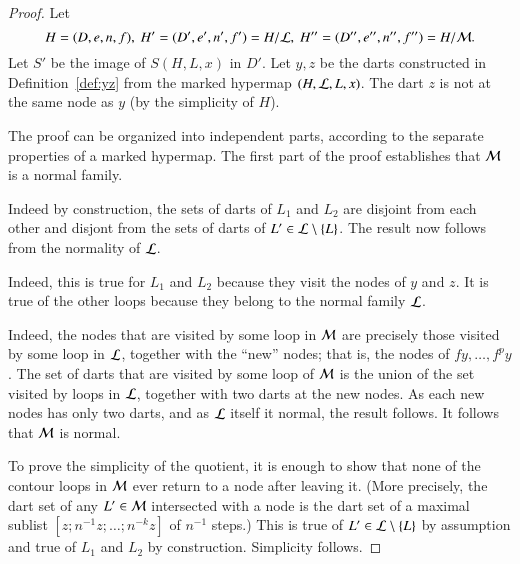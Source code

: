 \begin{proof} Let 
\begin{displaymath}
H=(D,e,n,f),\   H' =(D',e',n',f') = H/{\cal
    L},\  H'' = (D'',e'',n'',f'') = H/{\cal M}.   
\end{displaymath}
Let $S'$ be the image of $S(H,L,x)$ in $D'$.  Let $y,z$ be the darts
constructed in Definition~\ref{def:yz} from the marked hypermap $(H,{\cal
  L},L,x)$.  The dart $z$ is not at the same node as $y$ (by
the simplicity of $H$).

  The proof can be organized into independent parts, according to the separate
  properties of a marked hypermap.  The first part of the proof
  establishes that ${\cal M}$ is a normal family.


 
Indeed by construction, the sets of darts of $L_1$ and $L_2$
are disjoint from each other and disjont from the sets of darts of $L'\in
{\cal L}\setminus \{L\}$.  The result now follows from the normality of  ${\cal L}$.

   Indeed, this
is true for $L_1$ and $L_2$ because they visit the nodes of $y$ and
$z$.  It is true of the other loops because they belong to the
normal family ${\cal L}$. 

  
Indeed, the nodes that are visited by some loop in ${\cal M}$ are
precisely those visited by some loop in ${\cal L}$, together with the
``new'' nodes; that is, the nodes of $f y,\ldots,f^p y$.  The set of
darts that are visited by some loop of ${\cal M}$ is the union of the
set visited by loops in ${\cal L}$, together with two darts at the
new nodes.  As each new nodes has only two darts, and as ${\cal L}$ itself
it normal, the result follows. It follows that ${\cal M}$ is normal.  


 To prove the simplicity of the quotient, it is enough to show that
none of the contour
loops in ${\cal M}$  ever return to a node after leaving it.
 (More precisely, the dart set of any $L'\in{\cal M}$ intersected with a node
is the dart set of a maximal sublist $[z;n^{-1}z;\ldots;n^{-k}z]$ of $n^{-1}$ steps.)
This is true of $L'\in{\cal L}\setminus\{L\}$ by assumption and true of
$L_1$ and $L_2$ by construction.  Simplicity follows.


\end{proof}
